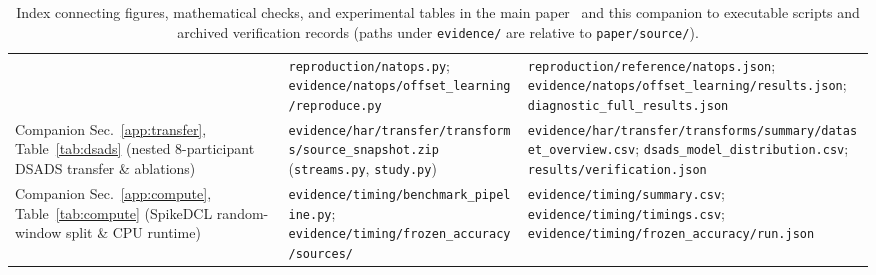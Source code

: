 \begin{table}[ht]
\begin{tabular}{@{}>{\raggedright\arraybackslash}p{4.3cm}>{\raggedright\arraybackslash}p{4.6cm}>{\raggedright\arraybackslash}p{6.1cm}@{}}
  & \nolinkurl{reproduction/natops.py}; \nolinkurl{evidence/natops/offset_learning/reproduce.py}
  & \nolinkurl{reproduction/reference/natops.json}; \nolinkurl{evidence/natops/offset_learning/results.json}; \nolinkurl{diagnostic_full_results.json} \\[4pt]
Companion Sec.~\ref{app:transfer}, Table~\ref{tab:dsads} (nested 8-participant DSADS transfer \& ablations)
  & \nolinkurl{evidence/har/transfer/transforms/source_snapshot.zip} (\nolinkurl{streams.py}, \nolinkurl{study.py})
  & \nolinkurl{evidence/har/transfer/transforms/summary/dataset_overview.csv}; \nolinkurl{dsads_model_distribution.csv}; \nolinkurl{results/verification.json} \\[4pt]
Companion Sec.~\ref{app:compute}, Table~\ref{tab:compute} (SpikeDCL random-window split \& CPU runtime)
  & \nolinkurl{evidence/timing/benchmark_pipeline.py}; \nolinkurl{evidence/timing/frozen_accuracy/sources/}
  & \nolinkurl{evidence/timing/summary.csv}; \nolinkurl{evidence/timing/timings.csv}; \nolinkurl{evidence/timing/frozen_accuracy/run.json} \\
\bottomrule
\end{tabular}
\caption{Index connecting figures, mathematical checks, and experimental tables in
the main paper~\cite{mainpaper} and this companion to executable scripts and
archived verification records (paths under \nolinkurl{evidence/} are relative to
\nolinkurl{paper/source/}).}
\label{tab:repro-index}
\end{table}
\FloatBarrier

